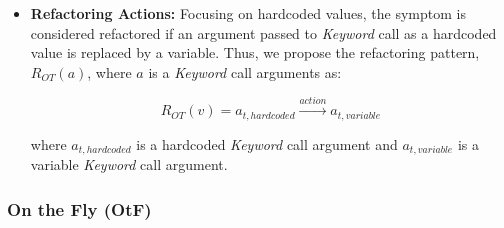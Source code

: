 \begin{itemize}
    \item \textbf{Refactoring Actions:} Focusing on hardcoded values, the symptom is considered refactored if an argument passed to \emph{Keyword} call as a hardcoded value is replaced by a variable. Thus, we propose the refactoring pattern, $R_{OT}(a)$, where $a$ is a \emph{Keyword} call arguments as:
    
    \begin{equation*}
        R_{OT}(v) = a_{t, hardcoded} \xrightarrow{action} a_{t, variable}
    \end{equation*}
    
    where $a_{t, hardcoded}$ is a hardcoded \emph{Keyword} call argument and $a_{t, variable}$ is a variable \emph{Keyword} call argument.
\end{itemize}

\subsubsection{On the Fly (OtF)}

